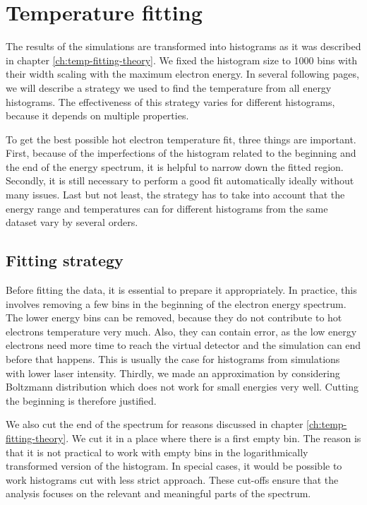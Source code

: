 \section{Temperature fitting}
The results of the simulations are transformed into histograms as it was described in chapter \ref{ch:temp-fitting-theory}. We fixed the histogram size to 1000 bins with their width scaling with the maximum electron energy. In several following pages, we will describe a strategy we used to find the temperature from all energy histograms. The effectiveness of this strategy varies for different histograms, because it depends on multiple properties.

To get the best possible hot electron temperature fit, three things are important. First, because of the imperfections of the histogram related to the beginning and the end of the energy spectrum, it is helpful to narrow down the fitted region. Secondly, it is still necessary to perform a good fit automatically ideally without many issues. Last but not least, the strategy has to take into account that the energy range and temperatures can for different histograms from the same dataset vary by several orders.

\subsection*{Fitting strategy}
Before fitting the data, it is essential to prepare it appropriately. In practice, this involves removing a few bins in the beginning of the electron energy spectrum. The lower energy bins can be removed, because they do not contribute to hot electrons temperature very much. Also, they can contain error, as the low energy electrons need more time to reach the virtual detector and the simulation can end before that happens. This is usually the case for histograms from simulations with lower laser intensity. Thirdly, we made an approximation by considering Boltzmann distribution which does not work for small energies very well. Cutting the beginning is therefore justified. 

We also cut the end of the spectrum for reasons discussed in chapter \ref{ch:temp-fitting-theory}. We cut it in a place where there is a first empty bin. The reason is that it is not practical to work with empty bins in the logarithmically transformed version of the histogram. In special cases, it would be possible to work histograms cut with less strict approach. These cut-offs ensure that the analysis focuses on the relevant and meaningful parts of the spectrum.


